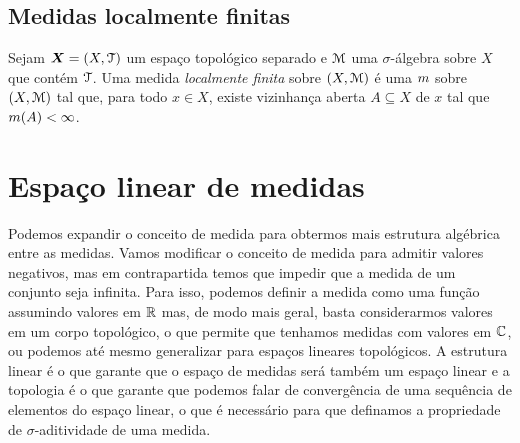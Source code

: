 
\subsection{Medidas localmente finitas}

\begin{definition}
Sejam $\bm X = (X,\mathcal{T})$ um espaço topológico separado e $\mathcal{M}$ uma $\sigma$-álgebra sobre $X$ que contém $\mathcal{T}$. Uma medida \emph{localmente finita} sobre $(X,\mathcal{M})$ é uma $m$ sobre $(X,\mathcal{M})$ tal que, para todo $x \in X$, existe vizinhança aberta $A \subseteq X$ de $x$ tal que $m(A) < \infty$.\end{definition}









\section{Espaço linear de medidas}

Podemos expandir o conceito de medida para obtermos mais estrutura algébrica entre as medidas. Vamos modificar o conceito de medida para admitir valores negativos, mas em contrapartida temos que impedir que a medida de um conjunto seja infinita. Para isso, podemos definir a medida como uma função assumindo valores em $\mathbb{R}$ mas, de modo mais geral, basta considerarmos valores em um corpo topológico, o que permite que tenhamos medidas com valores em $\mathbb{C}$, ou podemos até mesmo generalizar para espaços lineares topológicos. A estrutura linear é o que garante que o espaço de medidas será também um espaço linear e a topologia é o que garante que podemos falar de convergência de uma sequência de elementos do espaço linear, o que é necessário para que definamos a propriedade de $\sigma$-aditividade de uma medida.

